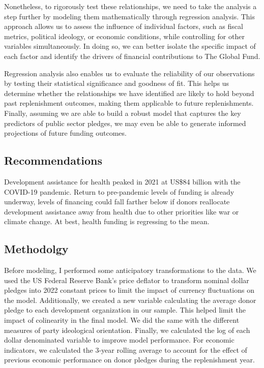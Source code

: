 \documentclass[
]{article}
\begin{document}
Nonetheless, to rigorously test these relationships, we need to take the
analysis a step further by modeling them mathematically through
regression analysis. This approach allows us to assess the influence of
individual factors, such as fiscal metrics, political ideology, or
economic conditions, while controlling for other variables
simultaneously. In doing so, we can better isolate the specific impact
of each factor and identify the drivers of financial contributions to
The Global Fund.

Regression analysis also enables us to evaluate the reliability of our
observations by testing their statistical significance and goodness of
fit. This helps us determine whether the relationships we have
identified are likely to hold beyond past replenishment outcomes, making
them applicable to future replenishments. Finally, assuming we are able
to build a robust model that captures the key predictors of public
sector pledges, we may even be able to generate informed projections of
future funding outcomes.

\subsection{Recommendations}\label{recommendations}

Development assistance for health peaked in 2021 at US\$84 billion with
the COVID-19 pandemic. Return to pre-pandemic levels of funding is
already underway, levels of financing could fall farther below if donors
reallocate development assistance away from health due to other
priorities like war or climate change. At best, health funding is
regressing to the mean.

\subsection{Methodolgy}\label{methodolgy}

Before modeling, I performed some anticipatory transformations to the
data. We used the US Federal Reserve Bank's price deflator to transform
nominal dollar pledges into 2022 constant prices to limit the impact of
currency fluctuations on the model. Additionally, we created a new
variable calculating the average donor pledge to each development
organization in our sample. This helped limit the impact of colinearity
in the final model. We did the same with the different measures of party
ideological orientation. Finally, we calculated the log of each dollar
denominated variable to improve model performance. For economic
indicators, we calculated the 3-year rolling average to account for the
effect of previous economic performance on donor pledges during the
replenishment year.
\end{document}
